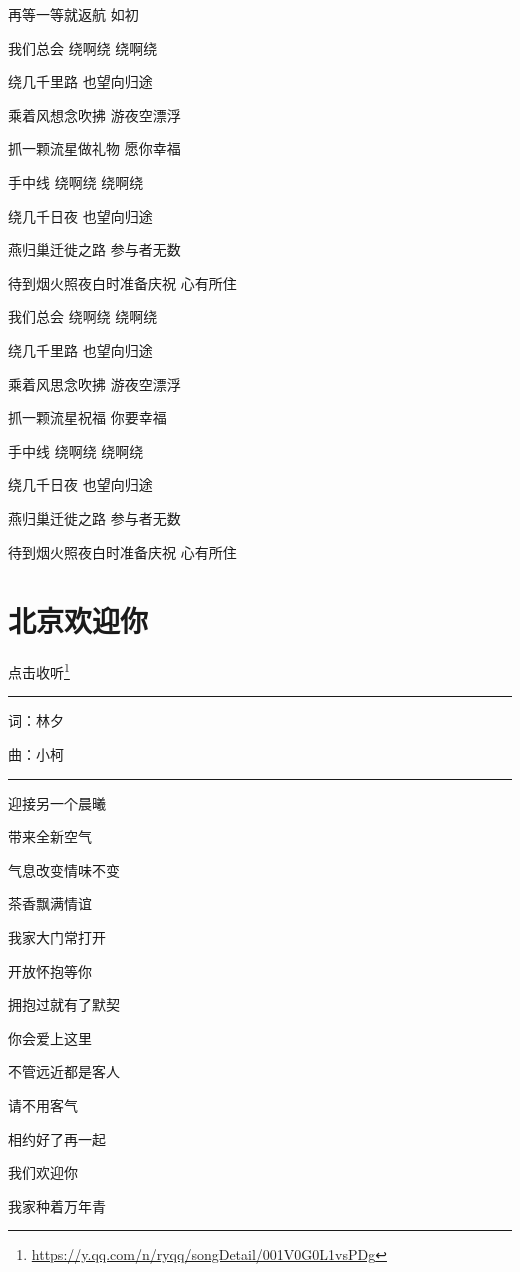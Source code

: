 \documentclass[]{ctexbook}
\renewcommand{\href}[2]{#2\footnote{\url{#1}}}
\begin{document}
再等一等就返航 如初

我们总会 绕啊绕 绕啊绕

绕几千里路 也望向归途

乘着风想念吹拂 游夜空漂浮

抓一颗流星做礼物 愿你幸福

手中线 绕啊绕 绕啊绕

绕几千日夜 也望向归途

燕归巢迁徙之路 参与者无数

待到烟火照夜白时准备庆祝 心有所住

我们总会 绕啊绕 绕啊绕

绕几千里路 也望向归途

乘着风思念吹拂 游夜空漂浮

抓一颗流星祝福 你要幸福

手中线 绕啊绕 绕啊绕

绕几千日夜 也望向归途

燕归巢迁徙之路 参与者无数

待到烟火照夜白时准备庆祝 心有所住

\section*{北京欢迎你}\label{welcome-to-beijing}


\href{https://y.qq.com/n/ryqq/songDetail/001V0G0L1vsPDg}{点击收听}

\begin{center}\rule{0.5\linewidth}{0.5pt}\end{center}

词：林夕

曲：小柯

\begin{center}\rule{0.5\linewidth}{0.5pt}\end{center}

迎接另一个晨曦

带来全新空气

气息改变情味不变

茶香飘满情谊

我家大门常打开

开放怀抱等你

拥抱过就有了默契

你会爱上这里

不管远近都是客人

请不用客气

相约好了再一起

我们欢迎你

我家种着万年青
\end{document}
